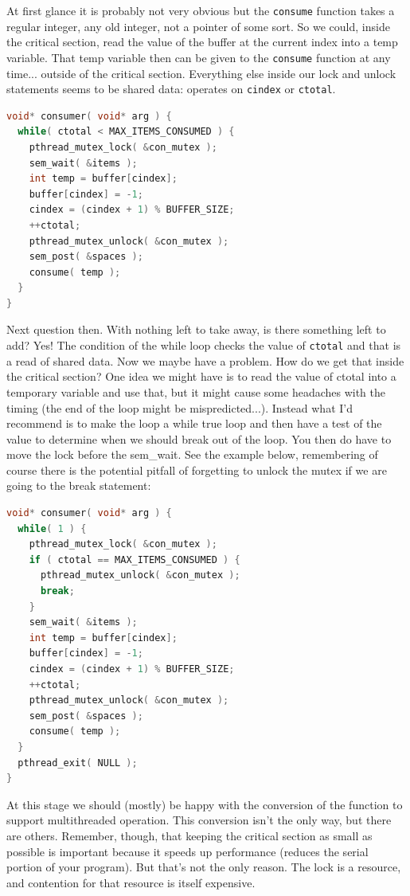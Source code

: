 \documentclass[a4paper]{report}
\begin{document}
At first glance it is probably not very obvious but the \texttt{consume} function takes a regular integer, any old integer, not a pointer of some sort. So we could, inside the critical section, read the value of the buffer at the current index into a temp variable. That temp variable then can be given to the \texttt{consume} function at any time... outside of the critical section. Everything else inside our lock and unlock statements seems to be shared data: operates on \texttt{cindex} or \texttt{ctotal}.

\begin{lstlisting}[language=C]
void* consumer( void* arg ) { 
  while( ctotal < MAX_ITEMS_CONSUMED ) {
    pthread_mutex_lock( &con_mutex );
    sem_wait( &items );
    int temp = buffer[cindex];
    buffer[cindex] = -1;
    cindex = (cindex + 1) % BUFFER_SIZE;
    ++ctotal;
    pthread_mutex_unlock( &con_mutex );
    sem_post( &spaces );
    consume( temp );
  }
}
\end{lstlisting}

Next question then. With nothing left to take away, is there something left to add? Yes! The condition of the while loop checks the value of \texttt{ctotal} and that is a read of shared data. Now we maybe have a problem. How do we get that inside the critical section? One idea we might have is to read the value of ctotal into a temporary variable and use that, but it might cause some headaches with the timing (the end of the loop might be mispredicted...).  Instead what I'd recommend is to make the loop a while true loop and then have a test of the value to determine when we should break out of the loop. You then do have to move the lock before the sem\_wait. See the example below, remembering of course there is the potential pitfall of forgetting to unlock the mutex if we are going to the break statement:

\begin{lstlisting}[language=C]
void* consumer( void* arg ) { 
  while( 1 ) { 
    pthread_mutex_lock( &con_mutex );  
    if ( ctotal == MAX_ITEMS_CONSUMED ) {
      pthread_mutex_unlock( &con_mutex );
      break;
    }   
    sem_wait( &items );
    int temp = buffer[cindex];
    buffer[cindex] = -1; 
    cindex = (cindex + 1) % BUFFER_SIZE;
    ++ctotal;
    pthread_mutex_unlock( &con_mutex );
    sem_post( &spaces );
    consume( temp );
  }
  pthread_exit( NULL );
}
\end{lstlisting}

At this stage we should (mostly) be happy with the conversion of the function to support multithreaded operation. This conversion isn't the only way, but there are others. Remember, though, that keeping the critical section as small as possible is important because it speeds up performance (reduces the serial portion of your program). But that's not the only reason. The lock is a resource, and contention for that resource is itself expensive.
\end{document}

